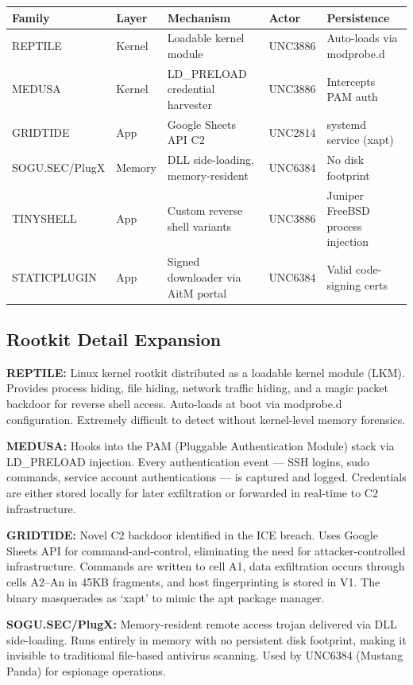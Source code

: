 \documentclass[11pt,a4paper]{article}
\begin{document}
\begin{longtable}{@{} p{2.2cm} p{1.5cm} p{3.5cm} p{2cm} p{4cm} @{}}
\toprule
\textbf{Family} & \textbf{Layer} & \textbf{Mechanism} & \textbf{Actor} & \textbf{Persistence} \\
\midrule
\endfirsthead
REPTILE & Kernel & Loadable kernel module & UNC3886 & Auto-loads via modprobe.d \\
MEDUSA & Kernel & LD\_PRELOAD credential harvester & UNC3886 & Intercepts PAM auth \\
GRIDTIDE & App & Google Sheets API C2 & UNC2814 & systemd service (xapt) \\
SOGU.SEC/PlugX & Memory & DLL side-loading, memory-resident & UNC6384 & No disk footprint \\
TINYSHELL & App & Custom reverse shell variants & UNC3886 & Juniper FreeBSD process injection \\
STATICPLUGIN & App & Signed downloader via AitM portal & UNC6384 & Valid code-signing certs \\
\bottomrule
\end{longtable}

\subsection{Rootkit Detail Expansion}

\textbf{REPTILE:} Linux kernel rootkit distributed as a loadable kernel module (LKM). Provides process hiding, file hiding, network traffic hiding, and a magic packet backdoor for reverse shell access. Auto-loads at boot via modprobe.d configuration. Extremely difficult to detect without kernel-level memory forensics.

\textbf{MEDUSA:} Hooks into the PAM (Pluggable Authentication Module) stack via LD\_PRELOAD injection. Every authentication event --- SSH logins, sudo commands, service account authentications --- is captured and logged. Credentials are either stored locally for later exfiltration or forwarded in real-time to C2 infrastructure.

\textbf{GRIDTIDE:} Novel C2 backdoor identified in the ICE breach. Uses Google Sheets API for command-and-control, eliminating the need for attacker-controlled infrastructure. Commands are written to cell A1, data exfiltration occurs through cells A2--An in 45KB fragments, and host fingerprinting is stored in V1. The binary masquerades as `xapt' to mimic the apt package manager.

\textbf{SOGU.SEC/PlugX:} Memory-resident remote access trojan delivered via DLL side-loading. Runs entirely in memory with no persistent disk footprint, making it invisible to traditional file-based antivirus scanning. Used by UNC6384 (Mustang Panda) for espionage operations.
\end{document}
